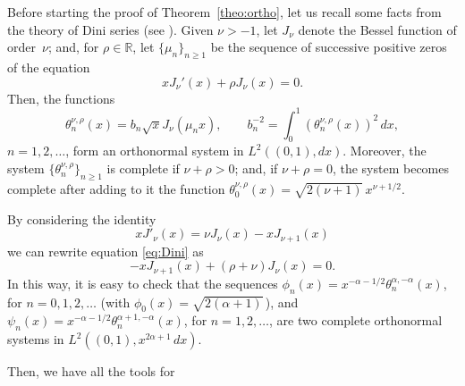 \documentclass[11pt]{amsart}
\theoremstyle{plain}
\begin{document}
Before starting the proof of Theorem~\ref{theo:ortho}, let us recall some facts from the theory of Dini series (see \cite[p.~134]{Watson}). Given $\nu>-1$, let $J_\nu$ denote the Bessel function of order~$\nu$; and, for $\rho\in{\mathbb{R}}$, let $\{\mu_n\}_{n\ge 1}$ be the sequence of successive positive zeros of the equation
\begin{equation}
\label{eq:Dini}
  xJ_{\nu}'(x)+\rho J_\nu(x) = 0.
\end{equation}
Then, the functions
\[
  \theta_n^{\nu,\rho}(x) = b_n\sqrt{x}J_{\nu}(\mu_n x),\qquad b_n^{-2}
  = \int_0^1 \left(\theta_n^{\nu,\rho}(x)\right)^2\, dx,
\]
$n = 1,2,\dots$, form an orthonormal system in $L^2((0,1),dx)$.
Moreover, the system $\{\theta_n^{\nu,\rho}\}_{n\ge 1}$ is complete if $\nu+\rho>0$;
and, if $\nu+\rho = 0$, the system becomes complete after adding
to it the function $\theta_0^{\nu,\rho}(x) = \sqrt{2(\nu+1)}\,x^{\nu+1/2}$.

By considering the identity
\[
  xJ'_{\nu}(x) = \nu J_{\nu}(x)-xJ_{\nu+1}(x)
\]
we can rewrite equation \eqref{eq:Dini} as
\[
  -xJ_{\nu+1}(x)+(\rho+\nu)J_{\nu}(x) = 0.
\]
In this way, it is easy to check that the sequences
$\phi_n(x) = x^{-\alpha-1/2} \theta_n^{\alpha,-\alpha}(x)$,
for $n = 0,1,2,\dots$ (with $\phi_0(x) = \sqrt{2(\alpha+1)}$\,),
and $\psi_n(x) = x^{-\alpha-1/2}\theta_n^{\alpha+1,-\alpha}(x)$,
for $n = 1,2,\dots$, are two complete orthonormal systems in
$L^2((0,1),x^{2\alpha+1}\,dx)$.

Then, we have all the tools for
\end{document}
